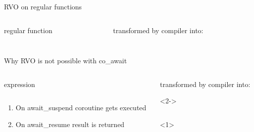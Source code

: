 \documentclass[10pt]{beamer}
\begin{document}
\begin{frame}[fragile]{RVO on regular functions}

\begin{columns}[T]
\begin{column}{0.4\linewidth}
\centerline{regular function}
\vfill
\inputminted{c++}{code-examples/RVO_examples/regular_function_rvo.cpp}
\vfill
\end{column}
\begin{column}{0.55\linewidth}
\centerline{transformed by compiler into:}
\vfill
\inputminted{c++}{code-examples/RVO_examples/transformed_function_rvo.cpp}
\vfill
\end{column}
\end{columns}

\end{frame}

\begin{frame}{Why RVO is not possible with co\_await}
\begin{columns}[T]
\begin{column}{0.3\linewidth}
\centerline{expression}
\vfill
\inputminted{c++}{code-examples/RVO_examples/co_await.cpp}
\vfill

\begin{enumerate}
	\item<2-> On \alert{await\_suspend} coroutine gets executed
	\item<3-> On \alert{await\_resume} result is returned
\end{enumerate}

\end{column}
\begin{column}{0.55\linewidth}
\centerline{transformed by compiler into:}
\vfill
\begin{onlyenv}<2->
\inputminted[highlightlines={5,8}]{c++}{code-examples/RVO_examples/transformed_co_await.cpp}
\end{onlyenv}
<1>
\vfill
\end{column}
\end{columns}
\end{frame}
\end{document}

